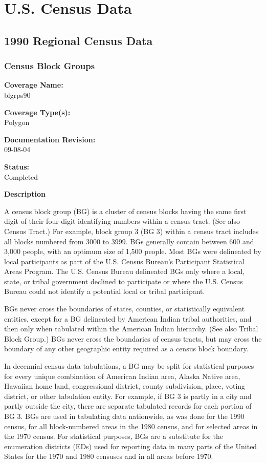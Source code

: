 
\chapter{U.S. Census Data}
\section{1990 Regional Census Data}
\subsection{Census Block Groups}

{\bf \large Coverage Name:}\\
blgrps90

{\bf \large Coverage Type(s):}\\
Polygon

{\bf \large Documentation Revision:}\\
09-08-04

{\bf \large Status:}\\
Completed

{\bf \large Description}

A census block group (BG) is a cluster of census blocks having the
same first digit of their four-digit identifying numbers within a
census tract. (See also Census Tract.) For example, block group 3
(BG 3) within a census tract includes all blocks numbered from
3000 to 3999. BGs generally contain between 600 and 3,000 people,
with an optimum size of 1,500 people. Most BGs were delineated by
local participants as part of the U.S. Census Bureau's Participant
Statistical Areas Program. The U.S. Census Bureau delineated BGs
only where a local, state, or tribal government declined to
participate or where the U.S. Census Bureau could not identify a
potential local or tribal participant.

BGs never cross the boundaries of states, counties, or
statistically equivalent entities, except for a BG delineated by
American Indian tribal authorities, and then only when tabulated
within the American Indian hierarchy. (See also Tribal Block
Group.) BGs never cross the boundaries of census tracts, but may
cross the boundary of any other geographic entity required as a
census block boundary.

In decennial census data tabulations, a BG may be split for
statistical purposes for every unique combination of American
Indian area, Alaska Native area, Hawaiian home land, congressional
district, county subdivision, place, voting district, or other
tabulation entity. For example, if BG 3 is partly in a city and
partly outside the city, there are separate tabulated records for
each portion of BG 3. BGs are used in tabulating data nationwide,
as was done for the 1990 census, for all block-numbered areas in
the 1980 census, and for selected areas in the 1970 census. For
statistical purposes, BGs are a substitute for the enumeration
districts (EDs) used for reporting data in many parts of the
United States for the 1970 and 1980 censuses and in all areas
before 1970.


